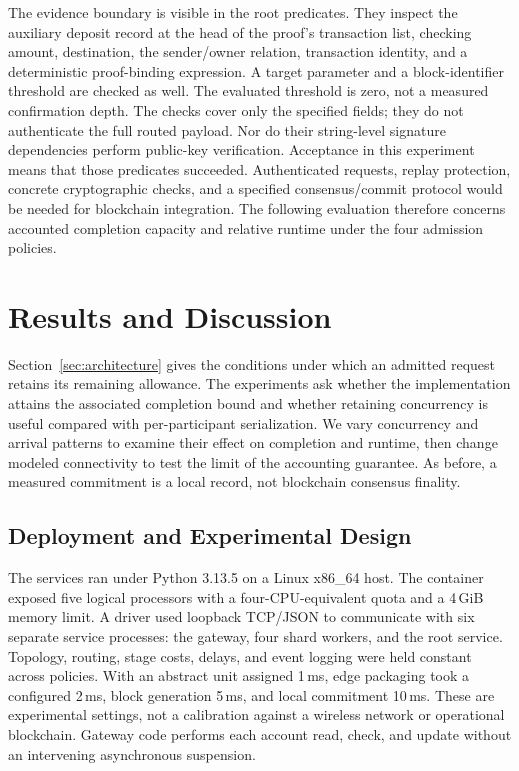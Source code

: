 The evidence boundary is visible in the root predicates. They inspect the
auxiliary deposit record at the head of the proof's transaction list,
checking amount, destination, the sender/owner relation, transaction identity,
and a deterministic proof-binding expression. A target parameter and a
block-identifier threshold are checked as well. The evaluated threshold is
zero, not a measured confirmation depth. The checks cover only the specified
fields; they do not authenticate the full routed payload. Nor do their
string-level signature dependencies perform public-key verification.
Acceptance in this experiment means that those predicates succeeded.
Authenticated requests, replay protection, concrete cryptographic checks,
and a specified consensus/commit protocol would be needed for blockchain
integration. The following evaluation therefore concerns accounted completion
capacity and relative runtime under the four admission policies.

\section{Results and Discussion}
\label{sec:results}

Section~\ref{sec:architecture} gives the conditions under which an admitted
request retains its remaining allowance. The experiments ask whether the
implementation attains the associated completion bound and whether retaining
concurrency is useful compared with per-participant serialization. We vary
concurrency and arrival patterns to examine their effect on completion and
runtime, then change modeled connectivity to test the limit of the accounting
guarantee. As before, a measured commitment is a local record, not blockchain
consensus finality.

\subsection{Deployment and Experimental Design}

The services ran under Python 3.13.5 on a Linux x86\_64 host. The container
exposed five logical processors with a four-CPU-equivalent quota and a 4\,GiB
memory limit. A driver used loopback TCP/JSON to communicate with six separate
service processes: the gateway, four shard workers, and the root service.
Topology, routing, stage costs, delays, and event logging were held constant
across policies. With an abstract unit assigned 1\,ms, edge packaging took
a configured 2\,ms, block generation 5\,ms, and local commitment 10\,ms.
These are experimental settings, not a calibration against a wireless network
or operational blockchain. Gateway code performs each account read, check,
and update without an intervening asynchronous suspension.

